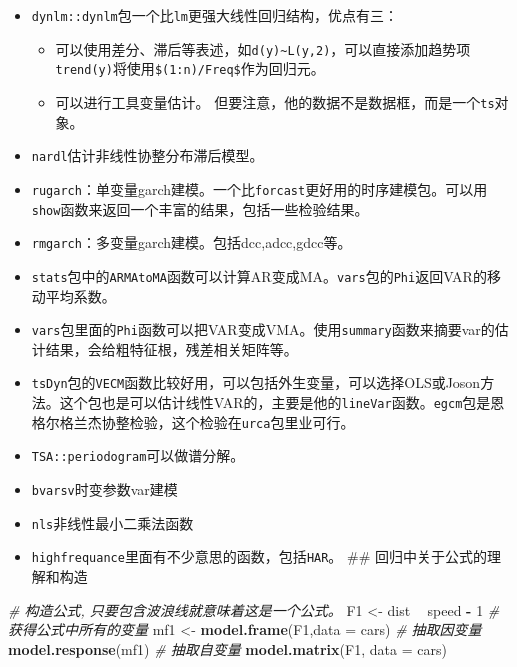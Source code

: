 \documentclass[
]{book}
\newenvironment{Shaded}{\begin{snugshade}}{\end{snugshade}}
\newcommand{\CommentTok}[1]{\textcolor[rgb]{0.56,0.35,0.01}{\textit{#1}}}
\newcommand{\DataTypeTok}[1]{\textcolor[rgb]{0.13,0.29,0.53}{#1}}
\newcommand{\DecValTok}[1]{\textcolor[rgb]{0.00,0.00,0.81}{#1}}
\newcommand{\KeywordTok}[1]{\textcolor[rgb]{0.13,0.29,0.53}{\textbf{#1}}}
\newcommand{\NormalTok}[1]{#1}
\newcommand{\OperatorTok}[1]{\textcolor[rgb]{0.81,0.36,0.00}{\textbf{#1}}}
\newcommand{\StringTok}[1]{\textcolor[rgb]{0.31,0.60,0.02}{#1}}
\providecommand{\tightlist}{%
  \setlength{\itemsep}{0pt}\setlength{\parskip}{0pt}}
\begin{document}
\begin{itemize}
\tightlist
\item
  \texttt{dynlm::dynlm}包一个比\texttt{lm}更强大线性回归结构，优点有三：

  \begin{itemize}
  \tightlist
  \item
    可以使用差分、滞后等表述，如\texttt{d(y)\textasciitilde{}L(y,2)}，可以直接添加趋势项\texttt{trend(y)}将使用\texttt{\$(1:n)/Freq\$}作为回归元。
  \item
    可以进行工具变量估计。
    但要注意，他的数据不是数据框，而是一个\texttt{ts}对象。
  \end{itemize}
\item
  \texttt{nardl}估计非线性协整分布滞后模型。
\item
  \texttt{rugarch}：单变量garch建模。一个比\texttt{forcast}更好用的时序建模包。可以用\texttt{show}函数来返回一个丰富的结果，包括一些检验结果。
\item
  \texttt{rmgarch}：多变量garch建模。包括dcc,adcc,gdcc等。
\item
  \texttt{stats}包中的\texttt{ARMAtoMA}函数可以计算AR变成MA。\texttt{vars}包的\texttt{Phi}返回VAR的移动平均系数。
\item
  \texttt{vars}包里面的\texttt{Phi}函数可以把VAR变成VMA。使用\texttt{summary}函数来摘要var的估计结果，会给粗特征根，残差相关矩阵等。
\item
  \texttt{tsDyn}包的\texttt{VECM}函数比较好用，可以包括外生变量，可以选择OLS或Joson方法。这个包也是可以估计线性VAR的，主要是他的\texttt{lineVar}函数。\texttt{egcm}包是恩格尔格兰杰协整检验，这个检验在\texttt{urca}包里业可行。
\item
  \texttt{TSA::periodogram}可以做谱分解。
\item
  \texttt{bvarsv}时变参数var建模
\item
  \texttt{nls}非线性最小二乘法函数
\item
  \texttt{highfrequance}里面有不少意思的函数，包括\texttt{HAR}。
  \#\# 回归中关于公式的理解和构造
\end{itemize}

\begin{Shaded}
\begin{Highlighting}[]
\CommentTok{# 构造公式, 只要包含波浪线就意味着这是一个公式。}
\NormalTok{F1 <-}\StringTok{ }\NormalTok{dist }\OperatorTok{~}\StringTok{ }\NormalTok{speed }\OperatorTok{-}\StringTok{ }\DecValTok{1}
\CommentTok{# 获得公式中所有的变量}
\NormalTok{mf1 <-}\StringTok{ }\KeywordTok{model.frame}\NormalTok{(F1,}\DataTypeTok{data =}\NormalTok{ cars)}
\CommentTok{# 抽取因变量}
\KeywordTok{model.response}\NormalTok{(mf1)}
\CommentTok{# 抽取自变量}
\KeywordTok{model.matrix}\NormalTok{(F1, }\DataTypeTok{data =}\NormalTok{ cars)}
\end{Highlighting}
\end{Shaded}
\end{document}
